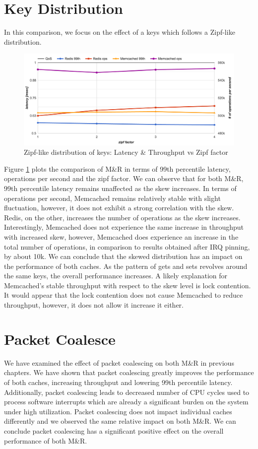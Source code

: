 \section{Key Distribution}
In this comparison, we focus on the effect of a keys which follows a Zipf-like distribution.

\begin{figure}[h]
    \includegraphics[width=\textwidth]{./res2/mr_zipf.png}
    \caption{Zipf-like distribution of keys: Latency \& Throughput vs Zipf factor}
    \label{fig:mr_zipf}
\end{figure}

Figure \ref{fig:mr_zipf} plots the comparison of M\&R in terms of 99th percentile latency, operations per second and the zipf factor. We can observe that for both M\&R, 99th percentile latency remains unaffected as the skew increases. In terms of operations per second, Memcached remains relatively stable with slight fluctuation, however, it does not exhibit a strong correlation with the skew. Redis, on the other, increases the number of operations as the skew increases. Interestingly, Memcached does not experience the same increase in throughput with increased skew, however, Memcached does experience an increase in the total number of operations, in comparison to results obtained after IRQ pinning, by about 10k. We can conclude that the skewed distribution has an impact on the performance of both caches. As the pattern of gets and sets revolves around the same keys, the overall performance increases. A likely explanation for Memcached's stable throughput with respect to the skew level is lock contention. It would appear that the lock contention does not cause Memcached to reduce throughput, however, it does not allow it increase it either.

\section{Packet Coalesce}
We have examined the effect of packet coalescing on both M\&R in previous chapters. We have shown that packet coalescing greatly improves the performance of both caches, increasing throughput and lowering 99th percentile latency. Additionally, packet coalescing leads to decreased number of CPU cycles used to process software interrupts which are already a significant burden on the system under high utilization. Packet coalescing does not impact individual caches differently and we observed the same relative impact on both M\&R. We can conclude packet coalescing has a significant positive effect on the overall performance of both M\&R.